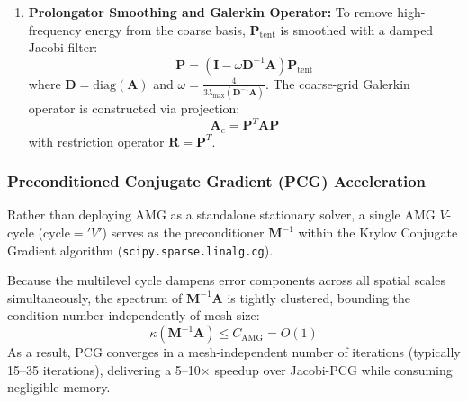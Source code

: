 \documentclass[11pt, a4paper]{article}
\begin{document}
\begin{enumerate}
\begin{itemize}
\begin{equation}
\begin{bmatrix}
        \mathbf{0} & \mathbf{0} & \mathbf{1} & \mathbf{y} & -\mathbf{x} & \mathbf{0}
        \end{bmatrix}
        \end{equation}
    \end{itemize}
    On each aggregate $\mathcal{A}_k$, local QR factorization of $\mathbf{B}|_{\mathcal{A}_k}$ defines the tentative prolongator $\mathbf{P}_{\text{tent}} \in \mathbb{R}^{N \times (N_c \cdot d_{\text{ns}})}$, guaranteeing exact partition of unity and coarse representation of near-nullspace modes ($\mathbf{P}_{\text{tent}} \mathbf{B}_c = \mathbf{B}$).
    \item \textbf{Prolongator Smoothing and Galerkin Operator:} To remove high-frequency energy from the coarse basis, $\mathbf{P}_{\text{tent}}$ is smoothed with a damped Jacobi filter:
    \begin{equation}
    \mathbf{P} = \left( \mathbf{I} - \omega \mathbf{D}^{-1} \mathbf{A} \right) \mathbf{P}_{\text{tent}}
    \end{equation}
    where $\mathbf{D} = \text{diag}(\mathbf{A})$ and $\omega = \frac{4}{3 \lambda_{\max}(\mathbf{D}^{-1}\mathbf{A})}$. The coarse-grid Galerkin operator is constructed via projection:
    \begin{equation}
    \mathbf{A}_c = \mathbf{P}^T \mathbf{A} \mathbf{P}
    \end{equation}
    with restriction operator $\mathbf{R} = \mathbf{P}^T$.
\end{enumerate}

\subsubsection{Preconditioned Conjugate Gradient (PCG) Acceleration}
Rather than deploying AMG as a standalone stationary solver, a single AMG $V$-cycle ($\text{cycle}='V'$) serves as the preconditioner $\mathbf{M}^{-1}$ within the Krylov Conjugate Gradient algorithm (\texttt{scipy.}\allowbreak\texttt{sparse.}\allowbreak\texttt{linalg.}\allowbreak\texttt{cg}). 

Because the multilevel cycle dampens error components across all spatial scales simultaneously, the spectrum of $\mathbf{M}^{-1}\mathbf{A}$ is tightly clustered, bounding the condition number independently of mesh size:
\begin{equation}
\kappa\left( \mathbf{M}^{-1} \mathbf{A} \right) \le C_{\text{AMG}} = O(1)
\end{equation}
As a result, PCG converges in a mesh-independent number of iterations (typically 15--35 iterations), delivering a 5--10$\times$ speedup over Jacobi-PCG while consuming negligible memory.
\end{document}

